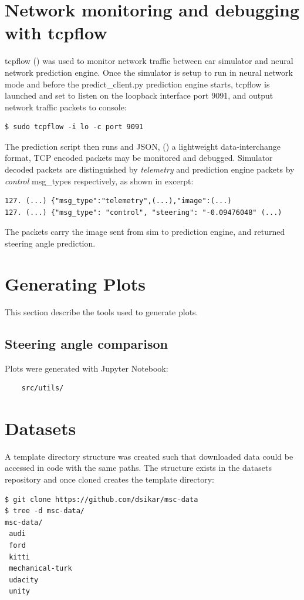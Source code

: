 \section{Network monitoring and debugging with tcpflow}
\label{NetMonDebug}
tcpflow (\cite{garfinkel2013passive}) was used to monitor network traffic between car simulator and neural network prediction engine. Once the simulator is setup to run in neural network mode and before the predict\_client.py prediction engine starts, tcpflow is launched and set to listen on the loopback interface port 9091, and output network traffic packets to console:
\begin{verbatim}
$ sudo tcpflow -i lo -c port 9091
\end{verbatim}
The prediction script then runs and JSON, (\cite{pezoa2016foundations}) a lightweight data-interchange format, TCP encoded packets may be monitored and debugged. Simulator decoded packets are distinguished by \textit{telemetry} and prediction engine packets by \textit{control} msg\_types respectively, as shown in excerpt:
\begin{verbatim}
127. (...) {"msg_type":"telemetry",(...),"image":(...)
127. (...) {"msg_type": "control", "steering": "-0.09476048" (...)
\end{verbatim}
The packets carry the image sent from sim to prediction engine, and returned steering angle prediction.

\section{Generating Plots}

This section describe the tools used to generate plots.

\subsection{Steering angle comparison}

Plots were generated with Jupyter Notebook:
\begin{verbatim}
    src/utils/
\end{verbatim}

\section{Datasets}
\label{appA:datasets}
A template directory structure was created such that downloaded data could be accessed in code with the same paths. The structure exists in the datasets repository and once cloned creates the template directory:
\begin{verbatim}
$ git clone https://github.com/dsikar/msc-data
$ tree -d msc-data/
msc-data/
 audi
 ford
 kitti
 mechanical-turk
 udacity
 unity
\end{verbatim}

